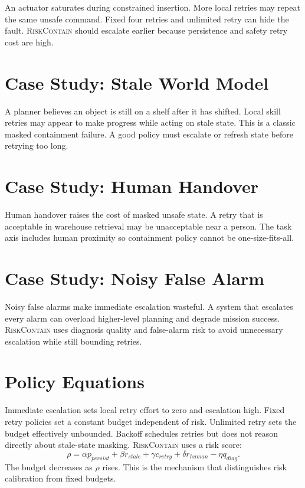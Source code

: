\documentclass{article}
\newcommand{\method}{\textsc{RiskContain}\xspace}
\begin{document}
An actuator saturates during constrained insertion. More local retries may repeat the same unsafe command. Fixed four retries and unlimited retry can hide the fault. \method should escalate earlier because persistence and safety retry cost are high.

\section{Case Study: Stale World Model}

A planner believes an object is still on a shelf after it has shifted. Local skill retries may appear to make progress while acting on stale state. This is a classic masked containment failure. A good policy must escalate or refresh state before retrying too long.

\section{Case Study: Human Handover}

Human handover raises the cost of masked unsafe state. A retry that is acceptable in warehouse retrieval may be unacceptable near a person. The task axis includes human proximity so containment policy cannot be one-size-fits-all.

\section{Case Study: Noisy False Alarm}

Noisy false alarms make immediate escalation wasteful. A system that escalates every alarm can overload higher-level planning and degrade mission success. \method uses diagnosis quality and false-alarm risk to avoid unnecessary escalation while still bounding retries.

\section{Policy Equations}

Immediate escalation sets local retry effort to zero and escalation high. Fixed retry policies set a constant budget independent of risk. Unlimited retry sets the budget effectively unbounded. Backoff schedules retries but does not reason directly about stale-state masking. \method uses a risk score:
\[
\rho = \alpha p_{persist} + \beta r_{stale} + \gamma c_{retry} + \delta r_{human} - \eta q_{diag}.
\]
The budget decreases as $\rho$ rises. This is the mechanism that distinguishes risk calibration from fixed budgets.
\end{document}
